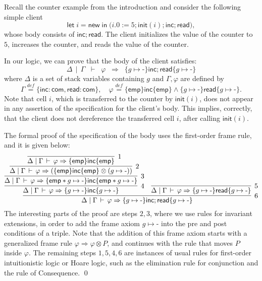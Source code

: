 \documentclass{LMCS}
\newcommand{\com}{\mathsf{com}}
\newcommand{\new}{\mathsf{new}}
\newcommand{\mletin}[2]{\mathsf{let}\;{#1}\;\mathsf{in}\;{#2}}
\newcommand{\blank}{\mbox{-}}
\newcommand{\emp}{\mathsf{emp}}
\newcommand{\pointsto}{\mapsto}
\newcommand{\mtri}[3]{\{{#1}\}{#2}\{{#3}\}}
\newcommand{\defeq}{\stackrel{\mathit{def}}{=}}
\newcommand{\init}{\mathsf{init}}
\newcommand{\inc}{\mathsf{inc}}
\newcommand{\mread}{\mathsf{read}}
\begin{document}
\begin{exa}\label{exa:client-counter}
Recall the counter example from the introduction and
consider the following simple client
$$
    \mletin{i{=}\new}{\bigl(i.0:=5;\init(i);\inc;\mread\bigr)},
$$
whose body consists of $\inc;\mread$.
The client initializes the value of the counter to $5$,
increases the counter, and reads the value of the counter.

In our logic, we can prove that the body of the client satisfies:
$$
  \Delta \,\mid\, \Gamma 
  \;\;\vdash\;\; 
  \varphi
  \;\;\Rightarrow\;\;
  \mtri{g\pointsto\blank}{\inc;\mread}{g\pointsto\blank}
$$
where $\Delta$ is a set of stack variables containing
$g$ and $\Gamma,\varphi$ are defined by
$$
  \Gamma
  \defeq
  \{\inc:\com, \mread:\com\},
\quad
  \varphi 
  \defeq
  \mtri{\emp}{\inc}{\emp} 
  \wedge 
  \mtri{g\pointsto\blank}{\mread}{g\pointsto\blank}.
$$
Note that cell $i$, which is transferred to the counter by $\init(i)$,
does not appear in any assertion of the specification for
the client's body. This implies, 
correctly, that the client does not dereference
the transferred cell $i$, after calling $\init(i)$.

The formal proof of the specification of the body
uses the first-order frame rule, and it is given below:
$$
\infer[6]{
  \Delta\mid\Gamma \,\vdash\,\varphi
  \Rightarrow \mtri{g\pointsto\blank}{\inc;\mread}{g\pointsto\blank}
}{
  \infer[4]{
    \Delta\mid\Gamma \,\vdash\,
    \varphi \Rightarrow \mtri{g\pointsto\blank}{\inc}{g\pointsto\blank}
  }{
    \infer[3]{
      \Delta\mid\Gamma \,\vdash\,
      \varphi \Rightarrow \mtri{\emp*g\pointsto\blank}{\inc}{\emp*g\pointsto\blank}
    }{
      \infer[2]{
        \Delta\mid\Gamma \,\vdash\,
        \varphi \Rightarrow (\mtri{\emp}{\inc}{\emp} \otimes (g\pointsto\blank))
      }{
        \infer[1]{
          \Delta\mid\Gamma \,\vdash\,
          \varphi \Rightarrow \mtri{\emp}{\inc}{\emp}
        }{}
      }
    }
  }
  &
  \infer[5]{
     \Delta \mid \Gamma \,\vdash\, \varphi \Rightarrow \mtri{g\pointsto\blank}{\mread}{g\pointsto\blank}
  }{}
}  
$$
The interesting parts of the proof are steps $2,3$,
where we use rules for invariant extensions, in order
to add the frame axiom $g\pointsto\blank$ into the pre
and post conditions of a triple. Note that
the addition of this frame axiom starts with a generalized
frame rule $\varphi \Rightarrow \varphi \otimes P$,
and continues with the rule that moves $P$ inside $\varphi$.
The remaining steps $1,5,4,6$ are instances of
 usual rules for first-order intuitionistic logic
or Hoare logic, such as the
elimination rule for conjunction
and the rule of Consequence.
\qed
\end{exa}
\end{document}
